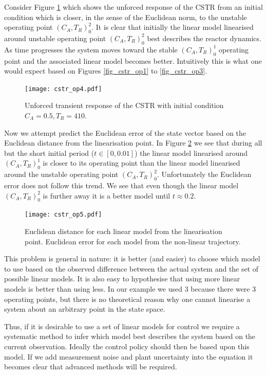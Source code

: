 \documentclass[../masters.tex]{subfiles}
\begin{document}
Consider Figure \ref{fig_cstr_op4} which shows the unforced response of the CSTR from an initial condition which is closer, in the sense of the Euclidean norm, to the unstable operating point $(C_A, T_R)_0^2$. It is clear that initially the linear model linearised around unstable operating point $(C_A, T_R)_0^2$ best describes the reactor dynamics. As time progresses the system moves toward the stable $(C_A, T_R)_0^1$ operating point and the associated linear model becomes better. Intuitively this is what one would expect based on Figures \ref{fig_cstr_op1} to \ref{fig_cstr_op3}.
\begin{figure}[H] 
\centering
\texttt{[image: cstr\_op4.pdf]}
\caption{Unforced transient response of the CSTR with initial condition $C_A = 0.5,T_R=410$.}
\label{fig_cstr_op4}
\end{figure}
Now we attempt predict the Euclidean error of the state vector based on the Euclidean distance from the linearisation point. In Figure \ref{fig_cstr_op5} we see that during all but the short initial period ($t \in [0, 0.01]$) the linear model linearised around $(C_A, T_R)_0^1$ is closer to its operating point than the linear model linearised around the unstable operating point $(C_A, T_R)_0^2$. Unfortunately the Euclidean error does not follow this trend. We see that even though the linear model $(C_A, T_R)_0^2$ is further away it is a better model until $t \approx 0.2$.  
\begin{figure}[H] 
\centering
\texttt{[image: cstr\_op5.pdf]}
\caption{Euclidean distance for each linear model from the linearisation point. Euclidean error for each model from the non-linear trajectory.}
\label{fig_cstr_op5}
\end{figure}
This problem is general in nature: it is better (and easier) to choose which model to use based on the observed difference between the actual system and the set of possible linear models. It is also easy to hypothesise that using more linear models is better than using less. In our example we used 3 because there were 3 operating points, but there is no theoretical reason why one cannot linearise a system about an arbitrary point in the state space.

Thus, if it is desirable to use a set of linear models for control we require a systematic method to infer which model best describes the system based on the current observation. Ideally the control policy should then be based upon this model. If we add measurement noise and plant uncertainty into the equation it becomes clear that advanced methods will be required. 

%
%
\end{document}
